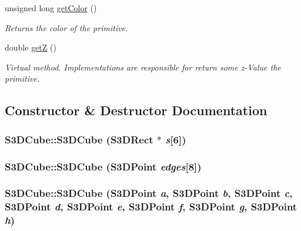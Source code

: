 \begin{DoxyCompactItemize}
unsigned long \hyperlink{class_s3_d_cube_ab856b6fa4c1b72be7d2d7b79e26f3c38}{getColor} ()
\begin{DoxyCompactList}\small\item\em Returns the color of the primitive. \item\end{DoxyCompactList}\item 
double \hyperlink{class_s3_d_cube_a4ac1d080b330d6b69d24097f746ddd4c}{getZ} ()
\begin{DoxyCompactList}\small\item\em Virtual method. Implementations are responsible for return some z-\/Value the primitive. \item\end{DoxyCompactList}\end{DoxyCompactItemize}


\subsection{Constructor \& Destructor Documentation}
\hypertarget{class_s3_d_cube_a071b56f85b667b74d0056d0d554d3647}{
\subsubsection[{S3DCube}]{\setlength{\rightskip}{0pt plus 5cm}S3DCube::S3DCube ({\bf S3DRect} $\ast$ {\em s}\mbox{[}6\mbox{]})}}
\label{class_s3_d_cube_a071b56f85b667b74d0056d0d554d3647}
\hypertarget{class_s3_d_cube_a6bda81748dd5c23028611bf2863bcd69}{
\subsubsection[{S3DCube}]{\setlength{\rightskip}{0pt plus 5cm}S3DCube::S3DCube ({\bf S3DPoint} {\em edges}\mbox{[}8\mbox{]})}}
\label{class_s3_d_cube_a6bda81748dd5c23028611bf2863bcd69}
\hypertarget{class_s3_d_cube_a96e5dcdd93eb3fcdcbadbce2f52e1890}{
\subsubsection[{S3DCube}]{\setlength{\rightskip}{0pt plus 5cm}S3DCube::S3DCube ({\bf S3DPoint} {\em a}, \/  {\bf S3DPoint} {\em b}, \/  {\bf S3DPoint} {\em c}, \/  {\bf S3DPoint} {\em d}, \/  {\bf S3DPoint} {\em e}, \/  {\bf S3DPoint} {\em f}, \/  {\bf S3DPoint} {\em g}, \/  {\bf S3DPoint} {\em h})}}
\label{class_s3_d_cube_a96e5dcdd93eb3fcdcbadbce2f52e1890}


